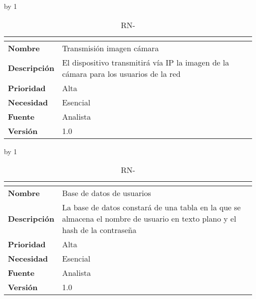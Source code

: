 \advance\rn by 1
\begin{table}[H]
	\caption{RN-\number\rn}
	\begin{tabular}{|l|p{}|}
		\hline
		\multicolumn{2}{|c|}{\cellcolor[HTML]{BFBFBF}{\color[HTML]{000000} \textbf{RN-\number\rn}}} \\ \hline
		\textbf{Nombre}      & Transmisión imagen cámara                                                            \\ \hline
		\textbf{Descripción} & El dispositivo transmitirá vía IP la imagen de la cámara para los usuarios de la red \\ \hline
		\textbf{Prioridad}   & Alta                                                                                 \\ \hline
		\textbf{Necesidad}   & Esencial                                                                             \\ \hline
		\textbf{Fuente}      & Analista                                                                             \\ \hline
		\textbf{Versión}     & 1.0                                                                                  \\ \hline
	\end{tabular}
\end{table}
\advance\rn by 1
\begin{table}[H]
	\caption{RN-\number\rn}
	\begin{tabular}{|l|p{}|}
		\hline
		\multicolumn{2}{|c|}{\cellcolor[HTML]{BFBFBF}{\color[HTML]{000000} \textbf{RN-\number\rn}}} \\ \hline
		\textbf{Nombre}      & Base de datos de usuarios                                                                                                   \\ \hline
		\textbf{Descripción} & La base de datos constará de una tabla en la que se almacena el nombre de usuario en texto plano y el hash de la contraseña \\ \hline
		\textbf{Prioridad}   & Alta                                                                                                                        \\ \hline
		\textbf{Necesidad}   & Esencial                                                                                                                    \\ \hline
		\textbf{Fuente}      & Analista                                                                                                                    \\ \hline
		\textbf{Versión}     & 1.0                                                                                                                         \\ \hline
	\end{tabular}
\end{table}
